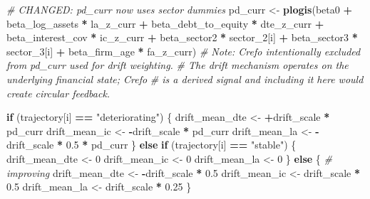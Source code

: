\documentclass[
]{article}
\newenvironment{Shaded}{\begin{snugshade}}{\end{snugshade}}
\newcommand{\CommentTok}[1]{\textcolor[rgb]{0.56,0.35,0.01}{\textit{#1}}}
\newcommand{\ControlFlowTok}[1]{\textcolor[rgb]{0.13,0.29,0.53}{\textbf{#1}}}
\newcommand{\DecValTok}[1]{\textcolor[rgb]{0.00,0.00,0.81}{#1}}
\newcommand{\FloatTok}[1]{\textcolor[rgb]{0.00,0.00,0.81}{#1}}
\newcommand{\FunctionTok}[1]{\textcolor[rgb]{0.13,0.29,0.53}{\textbf{#1}}}
\newcommand{\NormalTok}[1]{#1}
\newcommand{\OtherTok}[1]{\textcolor[rgb]{0.56,0.35,0.01}{#1}}
\newcommand{\SpecialCharTok}[1]{\textcolor[rgb]{0.81,0.36,0.00}{\textbf{#1}}}
\newcommand{\StringTok}[1]{\textcolor[rgb]{0.31,0.60,0.02}{#1}}
\begin{document}
\begin{Shaded}
\begin{Highlighting}[]
        \CommentTok{\# CHANGED: pd\_curr now uses sector dummies}
\NormalTok{        pd\_curr }\OtherTok{\textless{}{-}} \FunctionTok{plogis}\NormalTok{(beta0 }\SpecialCharTok{+}
\NormalTok{                            beta\_log\_assets     }\SpecialCharTok{*}\NormalTok{ la\_z\_curr  }\SpecialCharTok{+}
\NormalTok{                            beta\_debt\_to\_equity }\SpecialCharTok{*}\NormalTok{ dte\_z\_curr }\SpecialCharTok{+}
\NormalTok{                            beta\_interest\_cov   }\SpecialCharTok{*}\NormalTok{ ic\_z\_curr  }\SpecialCharTok{+}
\NormalTok{                            beta\_sector2        }\SpecialCharTok{*}\NormalTok{ sector\_2[i] }\SpecialCharTok{+}
\NormalTok{                            beta\_sector3        }\SpecialCharTok{*}\NormalTok{ sector\_3[i] }\SpecialCharTok{+}
\NormalTok{                            beta\_firm\_age       }\SpecialCharTok{*}\NormalTok{ fa\_z\_curr)}
        \CommentTok{\# Note: Crefo intentionally excluded from pd\_curr used for drift weighting.}
        \CommentTok{\# The drift mechanism operates on the underlying financial state; Crefo}
        \CommentTok{\# is a derived signal and including it here would create circular feedback.}
        
        \ControlFlowTok{if}\NormalTok{ (trajectory[i] }\SpecialCharTok{==} \StringTok{"deteriorating"}\NormalTok{) \{}
\NormalTok{          drift\_mean\_dte }\OtherTok{\textless{}{-}} \SpecialCharTok{+}\NormalTok{drift\_scale }\SpecialCharTok{*}\NormalTok{ pd\_curr}
\NormalTok{          drift\_mean\_ic  }\OtherTok{\textless{}{-}} \SpecialCharTok{{-}}\NormalTok{drift\_scale }\SpecialCharTok{*}\NormalTok{ pd\_curr}
\NormalTok{          drift\_mean\_la  }\OtherTok{\textless{}{-}} \SpecialCharTok{{-}}\NormalTok{drift\_scale }\SpecialCharTok{*} \FloatTok{0.5} \SpecialCharTok{*}\NormalTok{ pd\_curr}
\NormalTok{        \} }\ControlFlowTok{else} \ControlFlowTok{if}\NormalTok{ (trajectory[i] }\SpecialCharTok{==} \StringTok{"stable"}\NormalTok{) \{}
\NormalTok{          drift\_mean\_dte }\OtherTok{\textless{}{-}} \DecValTok{0}
\NormalTok{          drift\_mean\_ic  }\OtherTok{\textless{}{-}} \DecValTok{0}
\NormalTok{          drift\_mean\_la  }\OtherTok{\textless{}{-}} \DecValTok{0}
\NormalTok{        \} }\ControlFlowTok{else}\NormalTok{ \{  }\CommentTok{\# improving}
\NormalTok{          drift\_mean\_dte }\OtherTok{\textless{}{-}} \SpecialCharTok{{-}}\NormalTok{drift\_scale }\SpecialCharTok{*} \FloatTok{0.5}
\NormalTok{          drift\_mean\_ic  }\OtherTok{\textless{}{-}}\NormalTok{  drift\_scale }\SpecialCharTok{*} \FloatTok{0.5}
\NormalTok{          drift\_mean\_la  }\OtherTok{\textless{}{-}}\NormalTok{  drift\_scale }\SpecialCharTok{*} \FloatTok{0.25}
\NormalTok{        \}}
        

\end{Highlighting}
\end{Shaded}
\end{document}
